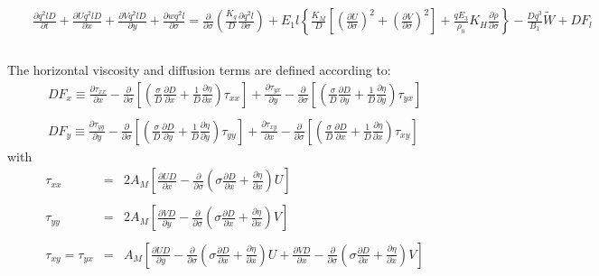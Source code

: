 \documentclass[oribibl]{llncs}
\begin{document}
\begin{eqnarray}
\\   
&&\frac{\partial q^2 l D}{\partial t} + \frac{\partial U q^2 l D}{\partial x} +\frac{\partial V q^2 l D}{\partial y} + \frac{\partial w q^2 l}{\partial \sigma}   = \frac{\partial}{\partial \sigma} \left( \frac{K_q}{D} \frac{\partial q^2 l}{\partial \sigma} \right)+ E_1  l \left\{ \frac{K_M}{D}\left[ \left( \frac{\partial U}{\partial \sigma}\right)^2 + \left( \frac{\partial V}{\partial \sigma}\right)^2 \right] + \frac{q E_3}{\rho_0}K_H\frac{\partial \rho}{\partial \sigma} \right\} - \frac{D q^3}{B_1} \widetilde{W} + D F_l    \label{eq:final7}\nonumber \\ 
\nonumber  \\ 
\end{eqnarray}

The horizontal viscosity and diffusion terms are defined according to:
\begin{eqnarray}
DF_x \equiv \frac{\partial \tau_{xx}}{\partial x} -\frac{\partial}{\partial \sigma} \left[ \left(  \frac{\sigma}{D} \frac{\partial D}{\partial x} + \frac{1}{D} \frac{\partial \eta}{\partial x} \right) \tau_{xx}  \right] +  \frac{\partial \tau_{yx}}{\partial y} -\frac{\partial}{\partial \sigma} \left[ \left(  \frac{\sigma}{D} \frac{\partial D}{\partial y} + \frac{1}{D} \frac{\partial \eta}{\partial y} \right) \tau_{yx}  \right]   \\ 
\nonumber \\ 
DF_y \equiv \frac{\partial \tau_{yy}}{\partial y} -\frac{\partial}{\partial \sigma} \left[ \left(  \frac{\sigma}{D} \frac{\partial D}{\partial y} + \frac{1}{D} \frac{\partial \eta}{\partial y} \right) \tau_{yy}  \right] +  \frac{\partial \tau_{xy}}{\partial x} -\frac{\partial}{\partial \sigma} \left[ \left(  \frac{\sigma}{D} \frac{\partial D}{\partial x} + \frac{1}{D} \frac{\partial \eta}{\partial x} \right) \tau_{xy}  \right]   
\end{eqnarray}
with
\begin{eqnarray}
\tau_{xx} &=& 2 A_M \left[ \frac{\partial UD}{\partial x} -\frac{\partial}{\partial \sigma} \left( \sigma \frac{\partial D}{\partial x} + \frac{\partial \eta}{\partial x} \right)U \right] \\
\nonumber \\
\tau_{yy} &=& 2 A_M \left[ \frac{\partial VD}{\partial y} -\frac{\partial}{\partial \sigma} \left( \sigma \frac{\partial D}{\partial x} + \frac{\partial \eta}{\partial x} \right)V \right] \\
\nonumber \\
\tau_{xy} = \tau_{yx} &=& A_M  \left[ \frac{\partial UD}{\partial y} -\frac{\partial}{\partial \sigma} \left( \sigma \frac{\partial D}{\partial x} + \frac{\partial \eta}{\partial x} \right)U +  \frac{\partial VD}{\partial x} -\frac{\partial}{\partial \sigma} \left( \sigma \frac{\partial D}{\partial x} + \frac{\partial \eta}{\partial x} \right)V \right]
\end{eqnarray}
\end{document}
